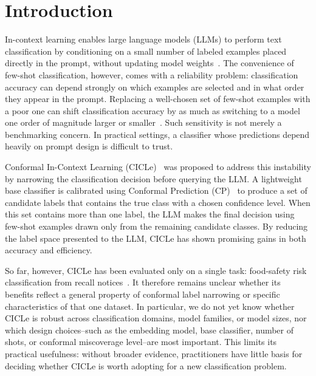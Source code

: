 \documentclass[runningheads]{llncs}
\begin{document}
\section{Introduction}
%
In-context learning enables large language models (LLMs) to perform text
classification by conditioning on a small number of labeled examples placed
directly in the prompt, without updating model weights~\cite{brown2020language}. The convenience of few-shot classification, however, comes with a reliability problem: classification accuracy can depend strongly on which examples are selected and in what order they appear in the prompt. Replacing a well-chosen set of few-shot examples with a poor one can shift classification accuracy by as much as switching to a model one order of magnitude larger or smaller~\cite{liu2022makes,lu2022fantastically}. Such sensitivity is not merely a benchmarking concern. In practical settings, a classifier whose predictions depend heavily on prompt design is difficult to trust.

Conformal In-Context Learning (CICLe)~\cite{randl2024cicle} was proposed to address this instability by narrowing the classification decision before querying the LLM. A lightweight base classifier is calibrated using Conformal Prediction (CP)~\cite{vovk2005algorithmic} to produce a set of candidate labels that contains the true class with a chosen confidence level. When this set contains more than one label, the LLM makes the final decision using few-shot examples drawn only from the remaining candidate classes. By reducing the label space presented to the LLM, CICLe has shown promising gains in both accuracy and efficiency.

So far, however, CICLe has been evaluated only on a single task: food-safety risk
classification from recall notices~\cite{randl2024cicle}. It therefore remains unclear whether its benefits reflect a general property of conformal label narrowing or specific characteristics of that one dataset. In particular, we do not yet know whether CICLe is robust across classification domains, model families, or model sizes, nor which design choices--such as the embedding model, base
classifier, number of shots, or conformal miscoverage level--are most important. This limits its practical usefulness: without broader evidence, practitioners have little basis for deciding whether CICLe is worth adopting for a new classification problem.
\end{document}
